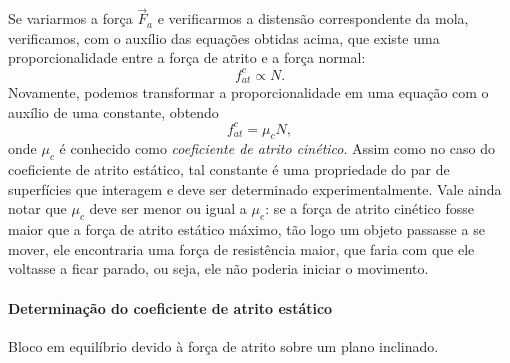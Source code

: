 Se variarmos a força $\vec{F}_a$ e verificarmos a distensão correspondente da mola, verificamos, com o auxílio das equações obtidas acima, que existe uma proporcionalidade entre a força de atrito e a força normal:
\begin{equation}
    f_{at}^c \propto N.
\end{equation}
%
Novamente, podemos transformar a proporcionalidade em uma equação com o auxílio de uma constante, obtendo
\begin{equation}
    f_{at}^c = \mu_c N,
\end{equation}
%
onde $\mu_c$ é conhecido como \emph{coeficiente de atrito cinético}. Assim como no caso do coeficiente de atrito estático, tal constante é uma propriedade do par de superfícies que interagem e deve ser determinado experimentalmente. Vale ainda notar que $\mu_c$ deve ser menor ou igual a $\mu_e$: se a força de atrito cinético fosse maior que a força de atrito estático máximo, tão logo um objeto passasse a se mover, ele encontraria uma força de resistência maior, que faria com que ele voltasse a ficar parado, ou seja, ele não poderia iniciar o movimento.

\paragraph{Determinação do coeficiente de atrito estático}

\begin{marginfigure}[5cm]
\centering
{}
\caption{Bloco em equilíbrio devido à força de atrito sobre um plano inclinado.}
\end{marginfigure}


